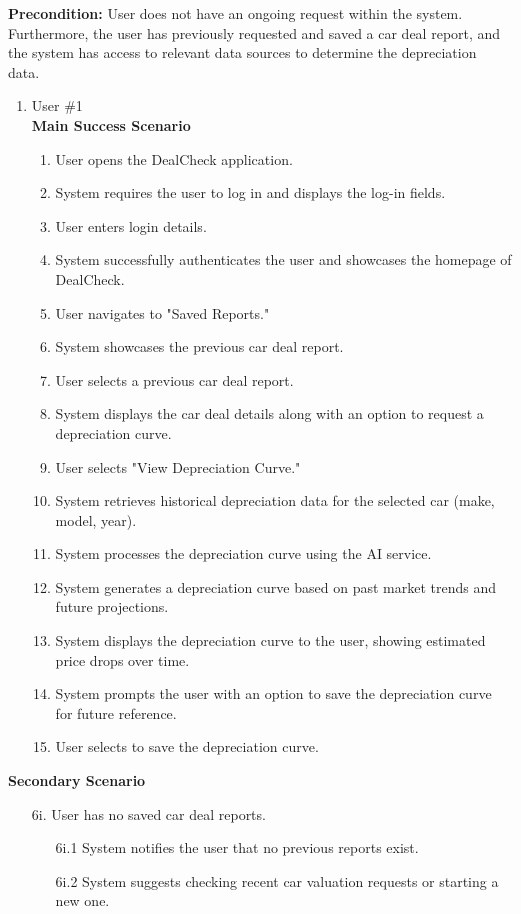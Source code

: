 \documentclass[]{article}
\begin{document}
\begin{enumerate}[{\bf {BE}1.}]
{\bf Precondition:} User does not have an ongoing request within the system. Furthermore, the user has previously requested and saved a car deal report, and the system 
	has access to relevant data sources to determine the depreciation data.
	\begin{enumerate}[{\bf VP1.}]
		\item User \#1 \\
		{\bf Main Success Scenario}
		\begin{enumerate}[1.]
			\item User opens the DealCheck application.
			\item System requires the user to log in and displays the log-in fields.
			\item User enters login details.
			\item System successfully authenticates the user and showcases the homepage of DealCheck.
			\item User navigates to "Saved Reports."
			\item System showcases the previous car deal report.
			\item User selects a previous car deal report.
			\item System displays the car deal details along with an option to request a depreciation curve.
			\item User selects "View Depreciation Curve."
			\item System retrieves historical depreciation data for the selected car (make, model, year).
			\item System processes the depreciation curve using the AI service.
			\item System generates a depreciation curve based on past market trends and future projections.
			\item System displays the depreciation curve to the user, showing estimated price drops over time.
			\item System prompts the user with an option to save the depreciation curve for future reference.
			\item User selects to save the depreciation curve.
		\end{enumerate}
	\end{enumerate}
		{\bf Secondary Scenario}
		\begin{enumerate}
			\item[6i.] User has no saved car deal reports.
			\begin{enumerate}
				\item[6i.1] System notifies the user that no previous reports exist.
				\item[6i.2] System suggests checking recent car valuation requests or starting a new one.
			\end{enumerate}
			

\end{enumerate}
\end{enumerate}
\end{document}

